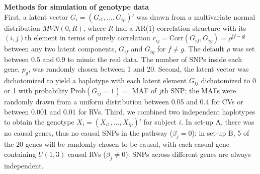 \documentclass[12pt]{article}
\begin{document}

\textbf{Methods for simulation of genotype data}\\
First, a latent vector $G_i = (G_{i1}, \ldots, G_{ip})'$ was drawn from a {multivariate normal distribution} $MVN(0,R)$, where $R$ had a AR(1) correlation structure with its $(i,j)$th element in terms of purely correlation $r_{ij} =\textrm{Corr} (G_{if}, G_{ig}) = \rho ^ { |f - g| }$ between any two latent components, $G_{if}$ and $G_{ig}$ for $f \neq g$. The default $\rho$ was set between $0.5$ and $0.9$ to mimic the real data. The number of SNPs inside each gene, $p_g$, was randomly chosen between 1 and 20. Second, the latent vector was dichotomized to yield a haplotype with each latent element $G_{ij}$ dichotomized to 0 or 1 with probability $\textrm{Prob} (G_{ij} = 1) = $ MAF of $j$th SNP; the MAFs were randomly drawn from a uniform distribution between 0.05 and 0.4 for CVs or between 0.001 and 0.01 for RVs. Third, we combined two independent haplotypes to obtain the genotype $X_i = (X_{i1}, \ldots, X_{ip})' $ for subject $i$. In set-up A, there was no causal genes, thus no causal SNPs in the pathway ($\beta_j = 0$); in set-up B, 5 of the 20 genes will be randomly chosen to be causal, with each casual gene containing $U(1,3)$ causal RVs ($\beta_j \neq 0$). SNPs across different genes are always independent.
\end{document}
